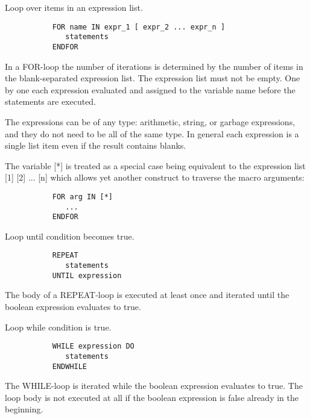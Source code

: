 \ENDCMD


   \par
Loop over items in an expression list.  

\begin{verbatim}
           FOR name IN expr_1 [ expr_2 ... expr_n ]
              statements
           ENDFOR
\end{verbatim}
\ENDVERB
   \par
In a FOR-loop the number of iterations is determined by the number of items 
   in the blank-separated expression list. The expression list must not be 
   empty. One by one each expression evaluated and assigned to the variable 
   name before the statements are executed.  

   \par
The expressions can be of any type: arithmetic, string, or garbage 
   expressions, and they do not need to be all of the same type. In general 
   each expression is a single list item even if the result contains blanks.  

   \par
The variable [*] is treated as a special case being equivalent to the 
   expression list \DQUOTE{}[1] [2] ... [n]\DQUOTE{} which allows yet another 
   construct to traverse the macro arguments:  

\begin{verbatim}
           FOR arg IN [*]
              ...
           ENDFOR
\end{verbatim}

\ENDCMD


   \par
Loop until condition becomes true.  

\begin{verbatim}
           REPEAT
              statements
           UNTIL expression
\end{verbatim}
\ENDVERB
   \par
The body of a REPEAT-loop is executed at least once and iterated until the 
   boolean expression evaluates to true.  

\ENDCMD


   \par
Loop while condition is true.  

\begin{verbatim}
           WHILE expression DO
              statements
           ENDWHILE
\end{verbatim}
\ENDVERB
   \par
The WHILE-loop is iterated while the boolean expression evaluates to true. 
   The loop body is not executed at all if the boolean expression is false 
   already in the beginning.  

